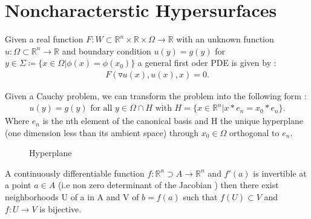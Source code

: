 \section{Noncharacterstic Hypersurfaces}
\begin{definition}
Given a real function  $F : W \subset \mathbb{R}^n \times  \mathbb{R} \times  \Omega \to \mathbb{R}$ with an unknown function $u : \Omega  \subset  \mathbb{R}^n \to \mathbb{R}$
and boundary condition $u(y) = g(y) $ for $y \in \Sigma \coloneqq \{x \in \Omega  | \phi(x) = \phi(x_0)\}  $ a general first oder PDE is given by : 
\begin{align*}
  F(\triangledown u(x),u(x),x) = 0
.\end{align*}
\end{definition}
\begin{comment}
 A cauchy problem can be a initial value problem or a boundary value problem 
\end{comment}
Given a Cauchy problem, we can transform the problem into the following form : 
\begin{align*}
  u(y) = g(y) \text{ for all } y \in  \Omega \cap H \text{ with } H = \{x \in  \mathbb{R}^n | x*e_n = x_0*e_n\}  
.\end{align*}
Where $e_n$ is the nth element of the canonical basis and H the unique hyperplane (one dimension less than its ambient space)
through $x_0 \in  \Omega $ orthogonal to $e_n$. 
\begin{figure}[h]
  \begin{center}
  \end{center}
  \caption{Hyperplane}
  \label{fig:}
\end{figure}
\begin{theorem}
 A continuously differentiable function $ f: \mathbb{R}^n \supset A \to  \mathbb{R}^n $ and 
 $f'(a)$ is invertible at a point $a \in  A$ (i.e non zero determinant of the Jacobian ) then there exist neighborhoods U of a in A and V of $b=f(a)$ such that $f(U) \subset  V$ and $f : U \to  V$ is bijective.
\end{theorem}
